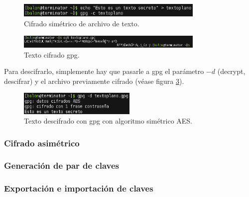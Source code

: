 \documentclass[a4paper, 11pt, titlepage]{article}
\begin{document}
        \begin{figure}[htp]
            \centering
            \includegraphics[width=0.8\textwidth]{resources/crypt01.png}
            \caption{Cifrado simétrico de archivo de texto.}
            \label{crypt01}
        \end{figure}

        \begin{figure}[htp]
            \centering
            \includegraphics[width=0.8\textwidth]{resources/crypt02.png}
            \caption{Texto cifrado gpg.}
            \label{crypt02}
        \end{figure}

        Para descifrarlo, simplemente hay que pasarle a gpg el parámetro $-d$ (decrypt, descifrar) y el archivo 
        previamente cifrado (véase figura \ref{decrypt01}).

        \begin{figure}[htp]
            \centering
            \includegraphics[width=0.5\textwidth]{resources/decrypt01.png}
            \caption{Texto descifrado con gpg con algoritmo simétrico AES.}
            \label{decrypt01}
        \end{figure}

    \subsubsection{Cifrado asimétrico}
        

        \subsubsection{Generación de par de claves}

        \subsubsection{Exportación e importación de claves}
\end{document}

